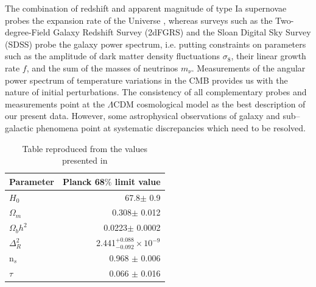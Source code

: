 \documentclass[paper=a4, fontsize=11pt]{scrartcl} %
\numberwithin{equation}{section} %
\numberwithin{figure}{section} %
\numberwithin{table}{section} %
\newcommand{\ignore}[1]{}
\begin{document}
The combination of redshift and apparent magnitude of type Ia supernovae probes the expansion rate of the Universe \citep[][]{SNeIa}, whereas surveys such as the Two-degree-Field Galaxy Redshift Survey (2dFGRS) \citep[][]{2dFGRS} and the Sloan Digital Sky Survey (SDSS) \citep[][]{SDSS} probe the galaxy power spectrum\ignore{ leading to the development of a theory of structure formation}, i.e. putting constraints on parameters such as the amplitude of dark matter density fluctuations $\sigma_8$, their linear growth rate $f$, and the sum of the masses of neutrinos $m_\nu$. Measurements of the angular power spectrum of temperature variations in the CMB \citep[COBE, WMAP, Planck][]{} provides us with the nature of initial perturbations. The consistency of all complementary probes and measurements point at the $\Lambda$CDM cosmological model as the best description of our present data. However, some astrophysical observations of galaxy and sub--galactic phenomena point at systematic discrepancies which need to be resolved.

\begin{table}
\begin{tabular}{l{}r}
\label{tab:LCDM_Planck15}
Parameter              & Planck 68$\%$ limit value \\
\hline
$H_0$ & 67.8$\pm$ 0.9 \\
$\Omega_m$ & 0.308$\pm$ 0.012 \\
$\Omega_b h^2$ & 0.0223$\pm$ 0.0002 \\
$\Delta^2_R$ & 2.441$^{+0.088}_{-0.092} \times 10^{-9}$ \\
n$_s$ & 0.968 $\pm$ 0.006\\
$\tau$ & 0.066 $\pm$ 0.016\\
\end{tabular}
\caption[Table caption text]{Table reproduced from the values presented in \citet[][]{Planck2015}}
\end{table}



\end{document}

